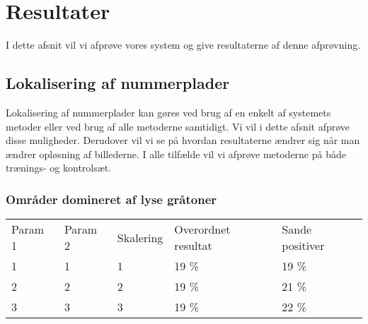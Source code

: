 \section{Resultater}
\label{sec:resultater}

I dette afsnit vil vi afprøve vores system og give resultaterne af denne afprøvning.






\subsection{Lokalisering af nummerplader}
Lokalisering af nummerplader kan gøres ved brug af en enkelt af systemets metoder eller ved brug af alle metoderne samtidigt. Vi vil i dette afsnit afprøve disse muligheder. Derudover vil vi se på hvordan resultaterne ændrer sig når man ændrer opløsning af billederne. I alle tilfælde vil vi afprøve metoderne på både trænings- og kontrolsæt. 

\subsubsection*{Områder domineret af lyse gråtoner}

\begin{tabular}{|l|l|l|l|l|}
\hline
\rowcolor[gray]{0.9} \multicolumn{5}{|>{\columncolor[gray]{0.9}}c|}{\textbf{Træningssæt}} \\ \hline
Param 1 & Param 2 & Skalering & Overordnet resultat & Sande positiver\\ \hline
1 & 1 & 1 & 19 \% & 19 \%\\ \hline
2 & 2 & 2 & 19 \% & 21 \% \\ \hline
3 & 3 & 3 & 19 \% & 22 \% \\
\hline
\end{tabular}

